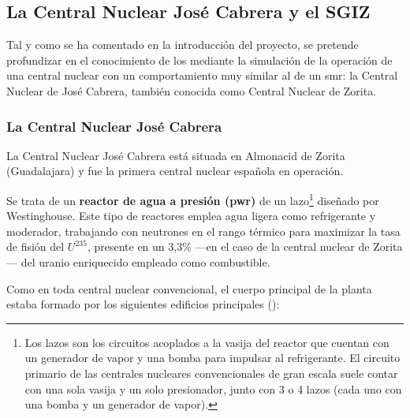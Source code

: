 \subsection{La Central Nuclear José Cabrera y el SGIZ}

Tal y como se ha comentado en la introducción del proyecto, se pretende profundizar en el conocimiento de los \emph{} mediante la simulación de la operación de una central nuclear con un comportamiento muy similar al de un \acrshort{smr}: la Central Nuclear de José Cabrera, también conocida como Central Nuclear de Zorita.

\subsubsection{La Central Nuclear José Cabrera}

La Central Nuclear José Cabrera está situada en Almonacid de Zorita (Guadalajara) y fue la primera central nuclear española en operación.

Se trata de un \textbf{reactor de agua a presión (\acrshort{pwr})} de un lazo\footnote{Los lazos son los circuitos acoplados a la vasija del reactor que cuentan con un generador de vapor y una bomba para impulsar al refrigerante. El circuito primario de las centrales nucleares convencionales de gran escala suele contar con una sola vasija y un solo presionador, junto con 3 o 4 lazos (cada uno con una bomba y un generador de vapor).} diseñado por Westinghouse. Este tipo de reactores emplea agua ligera como refrigerante y moderador, trabajando con neutrones en el rango térmico para maximizar la tasa de fisión del $U^{235}$, presente en un 3,3\% ---en el caso de la central nuclear de Zorita--- del uranio enriquecido empleado como combustible.

Como en toda central nuclear convencional, el cuerpo principal de la planta estaba formado por los siguientes edificios principales (\cite{documentacion_sgiz}):

